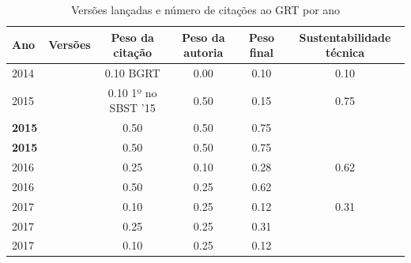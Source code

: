 \begin{table}[H]
\caption{Versões lançadas e número de citações ao GRT por ano}
\centering
\begin{tabular}{| l | c | c | c | c | c |}
  \hline
  Ano & Versões & Peso da citação & Peso da autoria & Peso final & Sustentabilidade técnica \\
  \hline
            2014
          &
          
          &
          0.10
            {\tiny BGRT}
          &
          0.00
          &
          0.10
          &
            {\color{red} 0.10}
          \\
\hline
            2015
          &
          
          &
          0.10
            {\tiny 1º no SBST '15}
          &
          0.50
          &
          0.15
          &
            {\color{blue} 0.75}
          \\
            {\bf 2015}
          &
          
          &
          0.50
          &
          0.50
          &
          0.75
          &
          \\
            {\bf 2015}
          &
          
          &
          0.50
          &
          0.50
          &
          0.75
          &
          \\
\hline
            2016
          &
          
          &
          0.25
          &
          0.10
          &
          0.28
          &
            {\color{blue} 0.62}
          \\
            2016
          &
          
          &
          0.50
          &
          0.25
          &
          0.62
          &
          \\
\hline
            2017
          &
          
          &
          0.10
          &
          0.25
          &
          0.12
          &
            {\color{red} 0.31}
          \\
            2017
          &
          
          &
          0.25
          &
          0.25
          &
          0.31
          &
          \\
            2017
          &
          
          &
          0.10
          &
          0.25
          &
          0.12
          &
          \\
\hline
\end{tabular}
\end{table}

